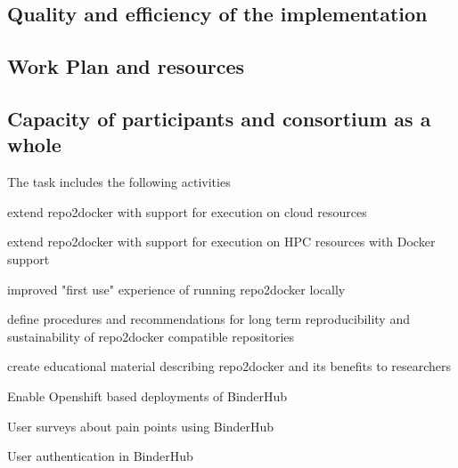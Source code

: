\documentclass[
  deliverables,
  longtasklabels,
  numericcites,
  noworkareas,
  svgnames,
  \classoptions
]{euproposal}       %
\begin{document}
\begin{proposal}

\section{Quality and efficiency of the implementation}

\subsection{Work Plan and resources}

\label{sect:workplan}

\newpage

% 

\draftpage
\subsection{Capacity of participants and consortium as a whole}

\draftpage


\end{proposal}

\begin{draft}


  The task includes the following activities
  \begin{compactitem}
  \item extend repo2docker with support for execution on cloud resources
  \item extend repo2docker with support for execution on HPC resources with Docker support
  \item improved "first use" experience of running repo2docker locally
  \item define procedures and recommendations for long term reproducibility and sustainability of repo2docker compatible repositories
  \item create educational material describing repo2docker and its benefits to researchers
  \item Enable Openshift based deployments of BinderHub
  \item User surveys about pain points using BinderHub
  \item User authentication in BinderHub
  \end{compactitem}
  \end{draft}
\end{document}
